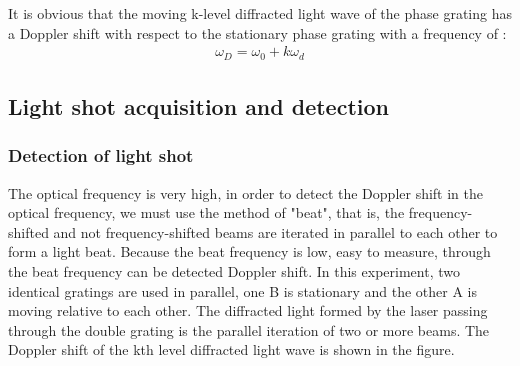 \documentclass[UTF8]{article}
\begin{document}
   It is obvious that the moving k-level diffracted light wave of the phase grating has a Doppler shift with respect to the stationary phase grating with a frequency of :
   \begin{eqnarray}
   \omega_{D}=\omega_{0}+k \omega_{d}
   \end{eqnarray}
   
   \subsection{Light shot acquisition and detection}
   \subsubsection{Detection of light shot}
   The optical frequency is very high, in order to detect the Doppler shift in the optical frequency, we must use the method of "beat", that is, the frequency-shifted and not frequency-shifted beams are iterated in parallel to each other to form a light beat. Because the beat frequency is low, easy to measure, through the beat frequency can be detected Doppler shift.
   In this experiment, two identical gratings are used in parallel, one B is stationary and the other A is moving relative to each other. The diffracted light formed by the laser passing through the double grating is the parallel iteration of two or more beams. The Doppler shift of the kth level diffracted light wave is shown in the figure.
\end{document}

